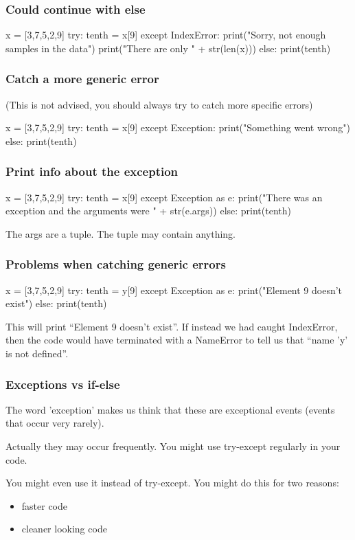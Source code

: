 \documentclass{beamer}
\begin{document}
\begin{frame}[fragile]
\frametitle{Could continue with else}
\begin{code}
x = [3,7,5,2,9]
try:
   tenth = x[9]
except IndexError:
   print("Sorry, not enough samples in the data")
   print("There are only " + str(len(x)))
else:
   print(tenth)
\end{code}
\end{frame}

\begin{frame}[fragile]
\frametitle{Catch a more generic error}
(This is not advised, you should always try to catch more specific errors)
\begin{code}
x = [3,7,5,2,9]
try:
   tenth = x[9]
except Exception:
   print("Something went wrong")
else:
   print(tenth)
\end{code}
\end{frame}

\begin{frame}[fragile]
\frametitle{Print info about the exception}
\begin{code}
x = [3,7,5,2,9]
try:
   tenth = x[9]
except Exception as e:
   print("There was an exception and the arguments were " + str(e.args))
else:
   print(tenth)
\end{code}
The args are a tuple. The tuple may contain anything.
\end{frame}

\begin{frame}[fragile]
\frametitle{Problems when catching generic errors}
\begin{code}
x = [3,7,5,2,9]
try:
   tenth = y[9]
except Exception as e:
   print("Element 9 doesn't exist")
else:
   print(tenth)
\end{code}
This will print ``Element 9 doesn't exist''. If instead we had
caught IndexError, then the code would have terminated with a
NameError to tell us that ``name 'y' is not defined''.
\end{frame}

\begin{frame}[fragile]
\frametitle{Exceptions vs if-else}
The word 'exception' makes us think that these are exceptional
events (events that occur very rarely).

Actually they may occur frequently. You might use try-except regularly
in your code.

You might even use it instead of try-except. You might do this for two
reasons:
\begin{itemize}
\item faster code
\item cleaner looking code
\end{itemize}
\end{frame}
\end{document}
